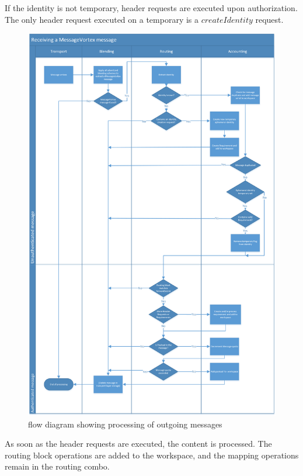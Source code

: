 If the identity is not temporary, header requests are executed upon authorization. The only header request executed on a temporary  is a $createIdentity$ request. 

\begin{figure}[ht]
	\centering
	\includegraphics[height=0.75\textheight]{inc/flowchart_message_receiving}
	\caption{flow diagram showing processing of outgoing messages}
	\label{fig:msgReceiveProcessing}
\end{figure}

As soon as the header requests are executed, the content is processed. The routing block operations are added to the workspace, and the mapping operations remain in the routing combo. 

